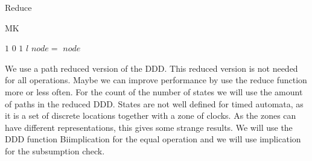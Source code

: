 \begin{algorithm}
\caption{Reduce}\label{alg:ReduceZero}
\begin{algorithmic}[1]
				\EndIf
			\EndFor
		\EndIf
	\EndFor
				\Break
			\EndIf
		\EndFor
	\EndFor
		\EndFor
	\EndFor
					\EndIf
				\EndFor
			\EndIf
		\EndFor
		\EndFor
	\EndFor
		
\EndProcedure
\end{algorithmic}
\end{algorithm}


\begin{algorithm}
\caption{MK}\label{alg:MK}
\begin{algorithmic}[1]
		\State \Return $1$
	\EndIf
		\State \Return $0$
	\EndIf
		\State \Return $1$
	\EndIf
		\State \Return $l$
	\EndIf
	\State $node =$ 
		\State {}
	\EndIf
	\State \Return $node$
\EndProcedure	
\end{algorithmic}
\end{algorithm}

We use a path reduced version of the DDD. This reduced version is not needed for all operations. Maybe we can improve performance by use the reduce function more or less often. For the count of the number of states we will use the amount of paths in the reduced DDD. States are not well defined for timed automata, as it is a set of discrete locations together with a zone of clocks. As the zones can have different representations, this gives some strange results. We will use the DDD function Biimplication for the equal operation and we will use implication for the subsumption check.

